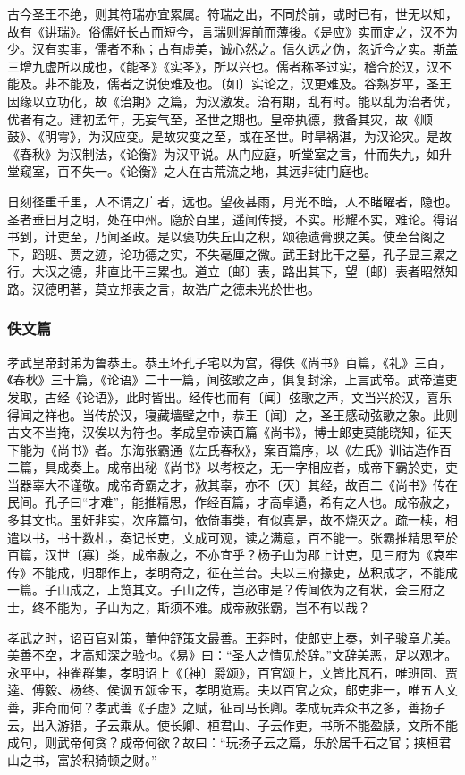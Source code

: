 \documentclass[]{article}
\begin{document}
古今圣王不绝，则其符瑞亦宜累属。符瑞之出，不同於前，或时已有，世无以知，故有《讲瑞》。俗儒好长古而短今，言瑞则渥前而薄後。《是应》实而定之，汉不为少。汉有实事，儒者不称；古有虚美，诚心然之。信久远之伪，忽近今之实。斯盖三增九虚所以成也，《能圣》《实圣》，所以兴也。儒者称圣过实，稽合於汉，汉不能及。非不能及，儒者之说使难及也。〔如〕实论之，汉更难及。谷熟岁平，圣王因缘以立功化，故《治期》之篇，为汉激发。治有期，乱有时。能以乱为治者优，优者有之。建初孟年，无妄气至，圣世之期也。皇帝执德，救备其灾，故《顺鼓》、《明雩》，为汉应变。是故灾变之至，或在圣世。时旱祸湛，为汉论灾。是故《春秋》为汉制法，《论衡》为汉平说。从门应庭，听堂室之言，什而失九，如升堂窥室，百不失一。《论衡》之人在古荒流之地，其远非徒门庭也。

日刻径重千里，人不谓之广者，远也。望夜甚雨，月光不暗，人不睹曜者，隐也。圣者垂日月之明，处在中州。隐於百里，遥闻传授，不实。形耀不实，难论。得诏书到，计吏至，乃闻圣政。是以褒功失丘山之积，颂德遗膏腴之美。使至台阁之下，蹈班、贾之迹，论功德之实，不失毫厘之微。武王封比干之墓，孔子显三累之行。大汉之德，非直比干三累也。道立〔邮〕表，路出其下，望〔邮〕表者昭然知路。汉德明著，莫立邦表之言，故浩广之德未光於世也。

\hypertarget{header-n794}{%
\subsubsection{佚文篇}\label{header-n794}}

孝武皇帝封弟为鲁恭王。恭王坏孔子宅以为宫，得佚《尚书》百篇，《礼》三百，《春秋》三十篇，《论语》二十一篇，闻弦歌之声，俱复封涂，上言武帝。武帝遣吏发取，古经《论语》，此时皆出。经传也而有〔闻〕弦歌之声，文当兴於汉，喜乐得闻之祥也。当传於汉，寝藏墙壁之中，恭王〔闻〕之，圣王感动弦歌之象。此则古文不当掩，汉俟以为符也。孝成皇帝读百篇《尚书》，博士郎吏莫能晓知，征天下能为《尚书》者。东海张霸通《左氏春秋》，案百篇序，以《左氏》训诂造作百二篇，具成奏上。成帝出秘《尚书》以考校之，无一字相应者，成帝下霸於吏，吏当器辜大不谨敬。成帝奇霸之才，赦其辜，亦不〔灭〕其经，故百二《尚书》传在民间。孔子曰``才难''，能推精思，作经百篇，才高卓遹，希有之人也。成帝赦之，多其文也。虽奸非实，次序篇句，依倚事类，有似真是，故不烧灭之。疏一椟，相遣以书，书十数札，奏记长吏，文成可观，读之满意，百不能一。张霸推精思至於百篇，汉世〔寡〕类，成帝赦之，不亦宜乎？杨子山为郡上计吏，见三府为《哀牢传》不能成，归郡作上，孝明奇之，征在兰台。夫以三府掾吏，丛积成才，不能成一篇。子山成之，上览其文。子山之传，岂必审是？传闻依为之有状，会三府之士，终不能为，子山为之，斯须不难。成帝赦张霸，岂不有以哉？

孝武之时，诏百官对策，董仲舒策文最善。王莽时，使郎吏上奏，刘子骏章尤美。美善不空，才高知深之验也。《易》曰：``圣人之情见於辞。''文辞美恶，足以观才。永平中，神雀群集，孝明诏上《〔神〕爵颂》，百官颂上，文皆比瓦石，唯班固、贾逵、傅毅、杨终、侯讽五颂金玉，孝明览焉。夫以百官之众，郎吏非一，唯五人文善，非奇而何？孝武善《子虚》之赋，征司马长卿。孝成玩弄众书之多，善扬子云，出入游猎，子云乘从。使长卿、桓君山、子云作吏，书所不能盈牍，文所不能成句，则武帝何贪？成帝何欲？故曰：``玩扬子云之篇，乐於居千石之官；挟桓君山之书，富於积猗顿之财。''
\end{document}

